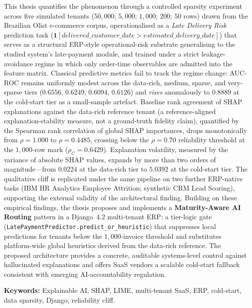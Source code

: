 \documentclass[12pt,a4paper,oneside]{report}
\begin{document}
This thesis quantifies the phenomenon through a controlled sparsity experiment across five simulated tenants ($50{,}000$; $5{,}000$; $1{,}000$; $200$; $50$ rows) drawn from the Brazilian Olist e-commerce corpus, operationalised as a \emph{Late Delivery Risk} prediction task ($\mathbf{1}[\textit{delivered\_customer\_date} > \textit{estimated\_delivery\_date}]$) that serves as a structural ERP-style operational-risk substrate generalising to the studied system's late-payment module, and trained under a strict leakage-avoidance regime in which only order-time observables are admitted into the feature matrix. Classical predictive metrics fail to track the regime change: AUC-ROC remains uniformly modest across the data-rich, medium, sparse, and very-sparse tiers ($0.6556$, $0.6249$, $0.6094$, $0.6126$) and \emph{rises} anomalously to $0.8889$ at the cold-start tier as a small-sample artefact. Baseline rank agreement of SHAP explanations against the data-rich reference tenant (a reference-aligned explanation-stability measure, not a ground-truth fidelity claim), quantified by the Spearman rank correlation of global SHAP importances, drops monotonically from $\rho = 1.000$ to $\rho = 0.4485$, crossing below the $\rho = 0.70$ reliability threshold at the $1{,}000$-row mark ($\rho_C = 0.6429$). Explanation volatility, measured by the variance of absolute SHAP values, expands by more than two orders of magnitude---from $0.0224$ at the data-rich tier to $5.0392$ at the cold-start tier. The qualitative cliff is replicated under the same pipeline on two further ERP-native tasks (IBM HR Analytics Employee Attrition; synthetic CRM Lead Scoring), supporting the external validity of the architectural finding. Building on these empirical findings, the thesis proposes and implements a \textbf{Maturity-Aware AI Routing} pattern in a Django~4.2 multi-tenant ERP: a tier-logic gate (\texttt{LatePaymentPredictor.predict\_or\_heuristic}) that suppresses local predictions for tenants below the $1{,}000$-invoice threshold and substitutes platform-wide global heuristics derived from the data-rich reference. The proposed architecture provides a concrete, auditable systems-level control against hallucinated explanations and offers SaaS vendors a scalable cold-start fallback consistent with emerging AI-accountability regulation.

\noindent\textbf{Keywords:} Explainable AI, SHAP, LIME, multi-tenant SaaS, ERP, cold-start, data sparsity, Django, reliability cliff.

\tableofcontents
\listoffigures
\listoftables

\clearpage
{}
\setcounter{page}{1}









\end{document}
